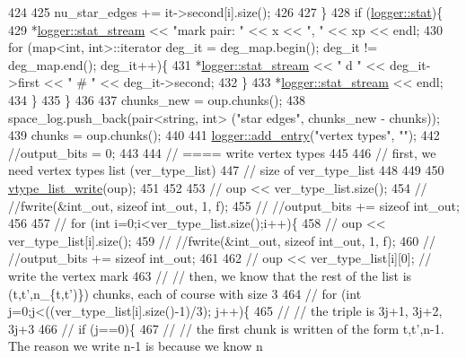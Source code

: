 \begin{DoxyCode}
424 
425       nu\_star\_edges += it->second[i].size();
426       
427     \}
428     \textcolor{keywordflow}{if} (\hyperlink{classlogger_a26812b5ba03f130e8dae3446d5fc032f}{logger::stat})\{
429       *\hyperlink{classlogger_a7db37821f875f2ba3540980b355779f5}{logger::stat\_stream} << \textcolor{stringliteral}{"mark pair: "} <<  x << \textcolor{stringliteral}{", "} << xp << endl;
430       \textcolor{keywordflow}{for} (map<int, int>::iterator deg\_it = deg\_map.begin(); deg\_it != deg\_map.end(); deg\_it++)\{
431         *\hyperlink{classlogger_a7db37821f875f2ba3540980b355779f5}{logger::stat\_stream} << \textcolor{stringliteral}{" d "} << deg\_it->first << \textcolor{stringliteral}{" # "} << deg\_it->second;
432       \}
433       *\hyperlink{classlogger_a7db37821f875f2ba3540980b355779f5}{logger::stat\_stream} << endl;
434     \}
435   \}
436   
437   chunks\_new = oup.chunks();
438   space\_log.push\_back(pair<string, int> (\textcolor{stringliteral}{"star edges"}, chunks\_new - chunks));
439   chunks = oup.chunks();
440 
441   \hyperlink{classlogger_a710163deb17bc81f70d53d285b8ac9ac}{logger::add\_entry}(\textcolor{stringliteral}{"vertex types"}, \textcolor{stringliteral}{""});
442   \textcolor{comment}{//output\_bits = 0;}
443   
444   \textcolor{comment}{// ==== write vertex types}
445 
446   \textcolor{comment}{// first, we need vertex types list (ver\_type\_list)}
447   \textcolor{comment}{// size of ver\_type\_list}
448 
449 
450   \hyperlink{classmarked__graph__compressed_a889749dd51bc37917a156e337eac142a}{vtype\_list\_write}(oup);
451 
452 
453   \textcolor{comment}{// oup <<  ver\_type\_list.size();}
454   \textcolor{comment}{// //fwrite(&int\_out, sizeof int\_out, 1, f);}
455   \textcolor{comment}{// //output\_bits += sizeof int\_out;}
456 
457   \textcolor{comment}{// for (int i=0;i<ver\_type\_list.size();i++)\{}
458   \textcolor{comment}{//   oup << ver\_type\_list[i].size();}
459   \textcolor{comment}{//   //fwrite(&int\_out, sizeof int\_out, 1, f);}
460   \textcolor{comment}{//   //output\_bits += sizeof int\_out;}
461 
462   \textcolor{comment}{//   oup << ver\_type\_list[i][0]; // write the vertex mark}
463   \textcolor{comment}{//   // then, we know that the rest of the list is (t,t',n\_\{t,t')\}) chunks, each of course with size 3}
464   \textcolor{comment}{//   for (int j=0;j<((ver\_type\_list[i].size()-1)/3); j++)\{}
465   \textcolor{comment}{//     // the triple is 3j+1, 3j+2, 3j+3}
466   \textcolor{comment}{//     if (j==0)\{}
467   \textcolor{comment}{//       // the first chunk is written of the form t,t',n-1. The reason we write n-1 is because we know n
}
\end{DoxyCode}
